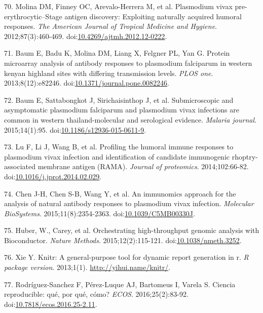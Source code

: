 \documentclass[]{article}
\begin{document}
\hypertarget{ref-molina2012}{}
70. Molina DM, Finney OC, Arevalo-Herrera M, et al. Plasmodium vivax
pre-erythrocytic--Stage antigen discovery: Exploiting naturally acquired
humoral responses. \emph{The American Journal of Tropical Medicine and
Hygiene}. 2012;87(3):460-469.
doi:\href{https://doi.org/10.4269/ajtmh.2012.12-0222}{10.4269/ajtmh.2012.12-0222}.

\hypertarget{ref-baum2013}{}
71. Baum E, Badu K, Molina DM, Liang X, Felgner PL, Yan G. Protein
microarray analysis of antibody responses to plasmodium falciparum in
western kenyan highland sites with differing transmission levels.
\emph{PLOS one}. 2013;8(12):e82246.
doi:\href{https://doi.org/10.1371/journal.pone.0082246}{10.1371/journal.pone.0082246}.

\hypertarget{ref-baum2015}{}
72. Baum E, Sattabongkot J, Sirichaisinthop J, et al. Submicroscopic and
asymptomatic plasmodium falciparum and plasmodium vivax infections are
common in western thailand-molecular and serological evidence.
\emph{Malaria journal}. 2015;14(1):95.
doi:\href{https://doi.org/10.1186/s12936-015-0611-9}{10.1186/s12936-015-0611-9}.

\hypertarget{ref-lu2014rama}{}
73. Lu F, Li J, Wang B, et al. Profiling the humoral immune responses to
plasmodium vivax infection and identification of candidate immunogenic
rhoptry-associated membrane antigen (RAMA). \emph{Journal of
proteomics}. 2014;102:66-82.
doi:\href{https://doi.org/10.1016/j.jprot.2014.02.029}{10.1016/j.jprot.2014.02.029}.

\hypertarget{ref-chen2015immunomics}{}
74. Chen J-H, Chen S-B, Wang Y, et al. An immunomics approach for the
analysis of natural antibody responses to plasmodium vivax infection.
\emph{Molecular BioSystems}. 2015;11(8):2354-2363.
doi:\href{https://doi.org/10.1039/C5MB00330J}{10.1039/C5MB00330J}.

\hypertarget{ref-Biobase}{}
75. Huber, W., Carey, et al. Orchestrating high-throughput genomic
analysis with Bioconductor. \emph{Nature Methods}. 2015;12(2):115-121.
doi:\href{https://doi.org/10.1038/nmeth.3252}{10.1038/nmeth.3252}.

\hypertarget{ref-knitr}{}
76. Xie Y. Knitr: A general-purpose tool for dynamic report generation
in r. \emph{R package version}. 2013;1(1).
\url{http://yihui.name/knitr/}.

\hypertarget{ref-CienciaReproducible2016}{}
77. Rodríguez-Sanchez F, Pérez-Luque AJ, Bartomeus I, Varela S. Ciencia
reproducible: qué, por qué, cómo? \emph{ECOS}. 2016;25(2):83-92.
doi:\href{https://doi.org/10.7818/ecos.2016.25-2.11}{10.7818/ecos.2016.25-2.11}.
\end{document}
